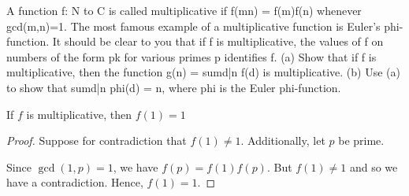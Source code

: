 
A function f: N to C is called multiplicative if f(mn) = f(m)f(n) whenever gcd(m,n)=1. The most famous example of a multiplicative function is Euler's phi-function. It should be clear to you that if f is multiplicative, the values of f on numbers of the form pk for various primes p identifies f. 
(a) Show that if f is multiplicative, then the function g(n) = sumd|n f(d) is multiplicative. 
(b) Use (a) to show that sumd|n phi(d) = n, where phi is the Euler phi-function. 

\begin{lemma}
    If $f$ is multiplicative, then $f(1) = 1$
\end{lemma}
\begin{proof}
    Suppose for contradiction that $f(1) \neq 1$. Additionally, let $p$ be
    prime.
    
    Since $\gcd(1, p) = 1$, we have $f(p) = f(1)f(p)$. But $f(1) \neq 1$ and so 
    we have a contradiction. Hence, $f(1) = 1$. 
\end{proof}

